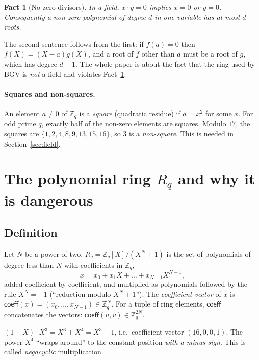 \documentclass[11pt,a4paper]{article}
\newcommand{\Z}{\mathbb{Z}}
\newcommand{\Zq}{\mathbb{Z}_q}
\newcommand{\Rq}{R_q}
\newcommand{\coeff}{\mathsf{coeff}}
\theoremstyle{definition}
\theoremstyle{plain}
\newtheorem{fact}[definition]{Fact}
\begin{document}
\begin{fact}[No zero divisors]\label{fact:nozd}
In a field, $x\cdot y=0$ implies $x=0$ or $y=0$. Consequently a non-zero polynomial of degree $d$
in one variable has at most $d$ roots.
\end{fact}

The second sentence follows from the first: if $f(a)=0$ then $f(X)=(X-a)g(X)$, and a root of $f$
other than $a$ must be a root of $g$, which has degree $d-1$. The whole paper is about the fact
that the ring used by BGV is \emph{not} a field and violates Fact~\ref{fact:nozd}.

\paragraph{Squares and non-squares.} An element $a\neq 0$ of $\Zq$ is a \emph{square}
(quadratic residue) if $a=x^2$ for some $x$. For odd prime $q$, exactly half of the non-zero
elements are squares. Modulo $17$, the squares are $\{1,2,4,8,9,13,15,16\}$, so $3$ is a
\emph{non-square}. This is needed in Section~\ref{sec:field}.

\section{The polynomial ring $R_q$ and why it is dangerous}
\label{sec:ring}

\subsection{Definition}

Let $N$ be a power of two. $\Rq=\Zq[X]/(X^N+1)$ is the set of polynomials of degree less than
$N$ with coefficients in $\Zq$,
\[
  x = x_0 + x_1X + \dots + x_{N-1}X^{N-1},
\]
added coefficient by coefficient, and multiplied as polynomials followed by the rule
$X^N=-1$ (``reduction modulo $X^N+1$''). The \emph{coefficient vector} of $x$ is
$\coeff(x)=(x_0,\dots,x_{N-1})\in\Zq^N$. For a tuple of ring elements, $\coeff$ concatenates the
vectors: $\coeff(u,v)\in\Zq^{2N}$.

\begin{example}[{Multiplication in $\Z_{17}[X]/(X^4+1)$}]
$(1+X)\cdot X^3 = X^3 + X^4 = X^3 - 1$, i.e.\ coefficient vector $(16,0,0,1)$.
The power $X^4$ ``wraps around'' to the constant position \emph{with a minus sign}. This is called
\emph{negacyclic} multiplication.
\end{example}
\end{document}
